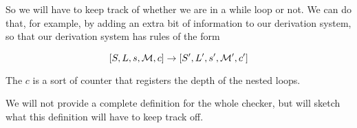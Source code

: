 So we will have to keep track of whether we are in a while loop or not. We can do that, for example, by adding an extra bit of information to our derivation system, so that our derivation system has rules of the form 

$$[ S, L, s, \mathcal{M}, c ] \to [ S', L', s', \mathcal{M'}, c' ]$$

The $c$ is a sort of counter that registers the depth of the nested loops. 

We will not provide a complete definition for the whole checker, but will sketch what this definition will have to keep track off. 

